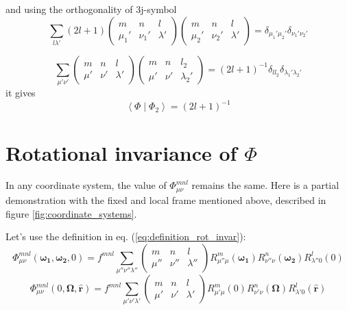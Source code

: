 and using the orthogonality of 3j-symbol \citep{Edmonds}
\begin{equation}
\sum_{l\lambda'}\left(2l+1\right)\left(\begin{array}{ccc}
m & n & l\\
\mu_{1}' & \nu_{1}' & \lambda'
\end{array}\right)\left(\begin{array}{ccc}
m & n & l\\
\mu_{2}' & \nu_{2}' & \lambda'
\end{array}\right)=\delta_{\mu_{1}'\mu_{2}'}\delta_{\nu_{1}'\nu_{2}'}
\end{equation}

\begin{equation}
\sum_{\mu'\nu'}\left(\begin{array}{ccc}
m & n & l\\
\mu' & \nu' & \lambda'
\end{array}\right)\left(\begin{array}{ccc}
m & n & l_{2}\\
\mu' & \nu' & \lambda_{2}'
\end{array}\right)=\left(2l+1\right)^{-1}\delta_{ll_{2}}\delta_{\lambda_{1}'\lambda_{2}'}
\end{equation}
it gives
\begin{equation}
\left\langle \Phi\mid\Phi_{2}\right\rangle =\left(2l+1\right)^{-1}
\end{equation}


\section{Rotational invariance of $\Phi$}

In any coordinate system, the value of $\Phi_{\mu\nu}^{mnl}$ remains
the same. Here is a partial demonstration with the fixed and local
frame mentioned above, described in figure \ref{fig:coordinate_systems}.

Let's use the definition in eq. (\ref{eq:definition_rot_invar}):
\begin{equation}
\Phi_{\mu\nu}^{mnl}(\boldsymbol{\omega_{1}},\boldsymbol{\omega_{2}},0)=f^{mnl}\sum_{\mu''\nu''\lambda''}\left(\begin{array}{ccc}
m & n & l\\
\mu'' & \nu'' & \lambda''
\end{array}\right)R_{\mu''\mu}^{m}(\boldsymbol{\omega_{1}})R_{\nu''\nu}^{n}(\boldsymbol{\omega_{2}})R_{\lambda''0}^{l}(0)
\end{equation}
\begin{equation}
\Phi_{\mu\nu}^{mnl}(0,\mathbf{\Omega},\mathbf{\hat{r}})=f^{mnl}\sum_{\mu'\nu'\lambda'}\left(\begin{array}{ccc}
m & n & l\\
\mu' & \nu' & \lambda'
\end{array}\right)R_{\mu'\mu}^{m}(0)R_{\nu'\nu}^{n}(\mathbf{\Omega})R_{\lambda'0}^{l}(\mathbf{\hat{r}})
\end{equation}


